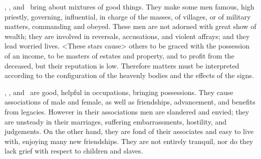 \Saturn, \Jupiter, and \Mars\, bring about mixtures of good things. They make some men famous, high priestly, governing, influential, in charge of the masses, of villages, or of military matters, commanding and obeyed. These men are not adorned with great show of wealth; they are involved in reversals, accusations, and violent affrays; and they lead worried lives. <These stars cause> others to be graced with the possession of an income, to be masters of estates and property, and to profit from the deceased, but their reputation is low. Therefore matters must be interpreted according to the configuration of the heavenly bodies and the effects of the signs.

\Saturn, \Jupiter, and \Venus\, are good, helpful in occupations, bringing possessions. They cause associations of male and female, as well as friendships, advancement, and benefits from legacies. However in their associations men are slandered and envied; they are unsteady in their marriages, suffering embarrassments, hostility, and judgements. On the other hand, they are fond of their associates and easy to live with, enjoying many new friendships. They are not entirely tranquil, nor do they lack grief with respect to children and slaves.

